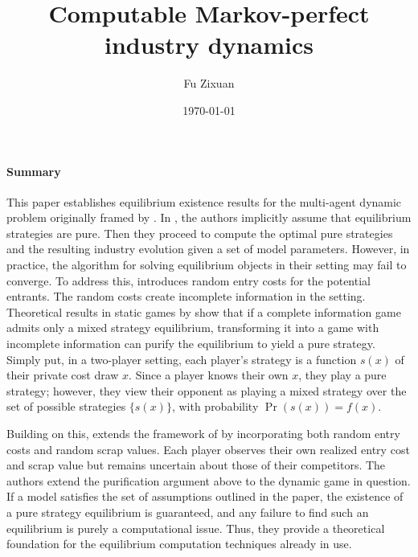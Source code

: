 \documentclass[12pt]{article}[margin=1in]
\title{\textbf{Computable Markov-perfect industry dynamics}}
\author{Fu Zixuan}
\date{\today}
\begin{document}
\maketitle




\paragraph{Summary} This paper \citep{doraszelski2010computable} establishes equilibrium existence results for the multi-agent dynamic problem originally framed by \citet{ericson1995markov}. In \citet{pakes1994computing}, the authors implicitly assume that equilibrium strategies are pure. Then they proceed to compute the optimal pure strategies and the resulting industry evolution given a set of model parameters. However, in practice, the algorithm for solving equilibrium objects in their setting may fail to converge. To address this, \citet{pakes1994computing} introduces random entry costs for the potential entrants. The random costs create incomplete information in the setting. Theoretical results in static games by \cite{harsanyi1973games} show that if a complete information game admits only a mixed strategy equilibrium, transforming it into a game with incomplete information can purify the equilibrium to yield a pure strategy. Simply put, in a two-player setting, each player's strategy is a function $s(x)$ of their private cost draw $x$. Since a player knows their own $x$, they play a pure strategy; however, they view their opponent as playing a mixed strategy over the set of possible strategies $\{s(x)\}$, with probability $\Pr(s(x))=f(x)$.

Building on this, \citet{doraszelski2010computable} extends the framework of \citet{pakes1994computing} by incorporating both random entry costs and random scrap values. Each player observes their own realized entry cost and scrap value but remains uncertain about those of their competitors. The authors extend the purification argument above to the dynamic game in question. If a model satisfies the set of assumptions outlined in the paper, the existence of a pure strategy equilibrium is guaranteed, and any failure to find such an equilibrium is purely a computational issue. Thus, they provide a theoretical foundation for the equilibrium computation techniques already in use.
\end{document}
